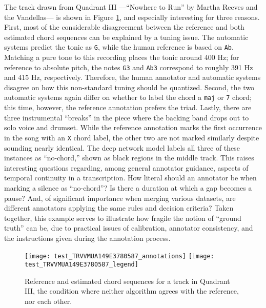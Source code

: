 The track drawn from Quadrant III ---``Nowhere to Run'' by Martha Reeves and the Vandellas--- is shown in Figure \ref{fig:test_quadIII}, and especially interesting for three reasons.
First, most of the considerable disagreement between the reference and both estimated chord sequences can be explained by a tuning issue.
The automatic systems predict the tonic as \texttt{G}, while the human reference is based on \texttt{Ab}.
Matching a pure tone to this recording places the tonic around 400 Hz;
for reference to absolute pitch, the notes \texttt{G3} and \texttt{Ab3} correspond to roughly 391 Hz and 415 Hz, respectively.
Therefore, the human annotator and automatic systems disagree on how this non-standard tuning should be quantized.
Second, the two automatic systems again differ on whether to label the chord a \texttt{maj} or \texttt{7} chord;
this time, however, the reference annotation prefers the triad.
Lastly, there are three instrumental ``breaks'' in the piece where the backing band drops out to solo voice and drumset.
While the reference annotation marks the first occurrence in the song with an \texttt{X} chord label, the other two are not marked similarly despite sounding nearly identical.
The deep network model labels all three of these instances as ``no-chord,'' shown as black regions in the middle track.
This raises interesting questions regarding, among general annotator guidance, aspects of temporal continuity in a transcription.
How literal should an annotator be when marking a silence as ``no-chord''?
Is there a duration at which a gap becomes a pause?
And, of significant importance when merging various datasets, are different annotators applying the same rules and decision criteria?
Taken together, this example serves to illustrate how fragile the notion of ``ground truth'' can be, due to practical issues of calibration, annotator consistency, and the instructions given during the annotation process.


\begin{figure}[t!]
\centering
\texttt{[image: test\_TRVVMUA149E3780587\_annotations]}
\texttt{[image: test\_TRVVMUA149E3780587\_legend]}
\caption{Reference and estimated chord sequences for a track in Quadrant III, the condition where neither algorithm agrees with the reference, nor each other.}
\label{fig:test_quadIII}
\end{figure}

